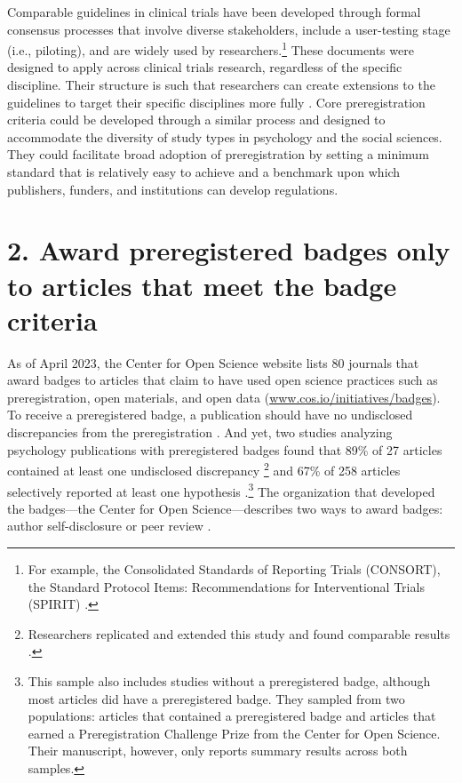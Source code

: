 \documentclass[authordate, meta, issue]{jote-new-article}
\begin{document}
Comparable guidelines in clinical trials have been developed through formal consensus processes that involve diverse stakeholders, include a user-testing stage (i.e., piloting), and are widely used by researchers.\footnote{For example, the Consolidated Standards of Reporting Trials (CONSORT), the Standard Protocol Items: Recommendations for Interventional Trials (SPIRIT) \parencites{Hopewell2022}.} These documents were designed to apply across clinical trials research, regardless of the specific discipline. Their structure is such that researchers can create extensions to the guidelines to target their specific disciplines more fully \parencites[e.g., traditional Chinese medicine:][]{Zhang2020}[pilot trials:][]{Thabane2016}. Core preregistration criteria could be developed through a similar process and designed to accommodate the diversity of study types in psychology and the social sciences. They could facilitate broad adoption of preregistration by setting a minimum standard that is relatively easy to achieve and a benchmark upon which publishers, funders, and institutions can develop regulations.







\section{2. Award preregistered badges only to articles that meet the badge criteria}



As of April 2023, the Center for Open Science website lists 80 journals that award badges to articles that claim to have used open science practices such as preregistration, open materials, and open data (\url{www.cos.io/initiatives/badges}). To receive a preregistered badge, a publication should have no undisclosed discrepancies from the preregistration \parencites{COS2023}. And yet, two studies analyzing psychology publications with preregistered badges found that 89\% of 27 articles contained at least one undisclosed discrepancy \parencites{Claesen2021}\footnote{ Researchers replicated and extended this study and found comparable results \parencites{Weaver2022}.} and 67\% of 258 articles selectively reported at least one hypothesis \parencites{vandenAkker2022}.\footnote{ This sample also includes studies without a preregistered badge, although most articles did have a preregistered badge. They sampled from two populations: articles that contained a preregistered badge and articles that earned a Preregistration Challenge Prize from the Center for Open Science. Their manuscript, however, only reports summary results across both samples.} The organization that developed the badges—the Center for Open Science—describes two ways to award badges: author self-disclosure or peer review \parencites{COS2016}.
\end{document}
